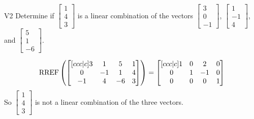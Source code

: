 \documentclass{sbgLAexam}
\begin{document}
\begin{problem}{V2} Determine if $\begin{bmatrix} 1 \\ 4 \\ 3 \end{bmatrix}$ is a linear combination of the vectors $\begin{bmatrix} 3 \\ 0 \\ -1 \end{bmatrix}$, $\begin{bmatrix} 1 \\ -1 \\ 4 \end{bmatrix}$, and $\begin{bmatrix} 5 \\ 1 \\  -6 \end{bmatrix}$.
\end{problem}
\begin{solution}
$$\operatorname{RREF}\left(\begin{bmatrix}[ccc|c] 3 & 1 & 5 & 1 \\ 0 & -1 & 1 & 4 \\ -1 & 4 & -6 & 3 \end{bmatrix} \right) = \begin{bmatrix}[ccc|c] 1 & 0 & 2 & 0 \\ 0 & 1 & -1 & 0 \\ 0 & 0 & 0 & 1 \end{bmatrix}$$
So $\begin{bmatrix} 1 \\ 4 \\ 3 \end{bmatrix}$ is not a linear combination of the three vectors.
\end{solution}
\end{document}
